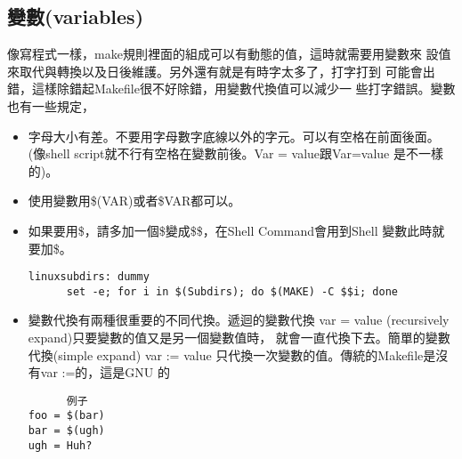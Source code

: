   \subsection{變數(variables)}
  像寫程式一樣，make規則裡面的組成可以有動態的值，這時就需要用變數來
  設值來取代與轉換以及日後維護。另外還有就是有時字太多了，打字打到
  可能會出錯，這樣除錯起Makefile很不好除錯，用變數代換值可以減少一
  些打字錯誤。變數也有一些規定，
  \begin{itemize}
    \item 字母大小有差。不要用字母數字底線以外的字元。可以有空格在前面後面。
          (像shell script就不行有空格在變數前後。Var = value跟Var=value
          是不一樣的)。
    \item 使用變數用\$(VAR)或者\${VAR}都可以。
    \item 如果要用\$，請多加一個\$變成\$\$，在Shell Command會用到Shell
          變數此時就要加\$。
          \begin{verbatim}
linuxsubdirs: dummy
	  set -e; for i in $(Subdirs); do $(MAKE) -C $$i; done
          \end{verbatim}
    \item 變數代換有兩種很重要的不同代換。遞迴的變數代換 var  = value 
	  (recursively expand)只要變數的值又是另一個變數值時，
	  就會一直代換下去。簡單的變數代換(simple expand) var := value 
          只代換一次變數的值。傳統的Makefile是沒有var :=的，這是GNU 的
          \begin{verbatim}
	  例子
foo = $(bar)
bar = $(ugh)
ugh = Huh?
	      

\end{verbatim}
\end{itemize}

